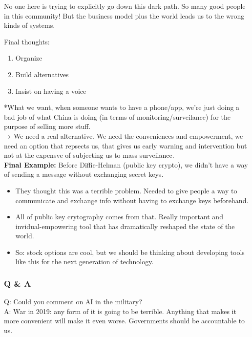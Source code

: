 No one here is trying to explicitly go down this dark path. So many good people in this community! But the business model plus the world leads us to the wrong kinds of systems.

Final thoughts:
\begin{enumerate}
    \item Organize
    \item Build alternatives
    \item Insist on having a voice
\end{enumerate}

*What we want, when someone wants to have a phone/app, we're just doing a bad job of what China is doing (in terms of monitoring/surveilance) for the purpose of selling more stuff. \\

$\rightarrow$ We need a real alternative. We need the conveniences and empowerment, we need an option that repsects us, that gives us early warning and intervention but not at the expensve of subjecting us to mass surveilance. \\

{\bf Final Example:} Before Diffie-Helman (public key crypto), we didn't have a way of sending a message without exchanging secret keys. 
\begin{itemize}
    \item They thought this was a terrible problem. Needed to give people a way to communicate and exchange info without having to exchange keys beforehand.
    
    \item All of public key crytography comes from that. Really important and invidual-empowering tool that has dramatically reshaped the state of the world.
    
    \item So: stock options are cool, but we should be thinking about developing tools like this for the next generation of technology.
\end{itemize}


\subsubsection{Q \& A}

Q: Could you comment on AI in the military? \\

A: War in 2019: any form of it is going to be terrible. Anything that makes it more convenient will make it even worse. Governments should be accountable to us. \\

